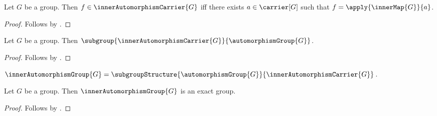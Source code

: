 \begin{proposition}\label{inner_automorphism_carrier_iff}
    Let $G$ be a group.
    Then $f\in\innerAutomorphismCarrier{G}$ iff
        there exists $a\in\carrier[G]$ such that
            $f=\apply{\innerMap{G}}{a}$.
\end{proposition}
\begin{proof}
    Follows by
        .
\end{proof}

\begin{theorem}\label{inner_automorphism_carrier_subgroup}
    Let $G$ be a group.
    Then
        $\subgroup
            {\innerAutomorphismCarrier{G}}
            {\automorphismGroup{G}}$.
\end{theorem}
\begin{proof}
    Follows by
        .
\end{proof}

\begin{definition}\label{inner_automorphism_group}
    $\innerAutomorphismGroup{G}=
        \subgroupStructure
            {\automorphismGroup{G}}
            {\innerAutomorphismCarrier{G}}$.
\end{definition}

\begin{theorem}\label{inner_automorphism_group_is_exact_group}
    Let $G$ be a group.
    Then $\innerAutomorphismGroup{G}$ is an exact group.
\end{theorem}
\begin{proof}
    Follows by
        .
\end{proof}

